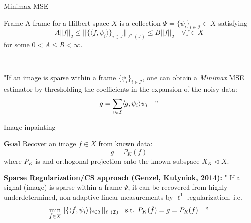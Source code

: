 \begin{frame}{Minimax MSE}

\begin{block}{Frame}
A frame for a Hilbert space $X$ is a collection $\Psi=\{\psi_i\}_{i\in\mathcal{I}}\subset X$ satisfying
$$
A ||f||_2\leq ||\{\langle f,\psi_i\rangle\}_{i\in\mathcal{I}}||_{\ell^2(\mathcal{I})}\leq B||f||_2  \quad \forall f\in X
$$
for some $0<A\leq B<\infty$.
\end{block}

\
\pause

\begin{theorem}[Labate et al., 2012]
"If an image is sparse within a frame $\{\psi_i\}_{i\in \mathcal{I}}$, one can obtain a \textit{Minimax} MSE estimator by thresholding the coefficients in the expansion of the noisy data:
$$
g = \sum_{i\in\mathcal{I}}\langle g,\psi_i\rangle\psi_i \quad "
$$
\end{theorem}
\end{frame}

\begin{frame}{Image inpainting}

\begin{block}{\textbf{Goal}}
 Recover an image $f\in X$ from known data:
$$
g = P_K(f)
$$
where $P_K$ is and orthogonal projection onto the known subspace $X_K\triangleleft X$.
\end{block}

\pause
\bigskip

\begin{block}{\textbf{Sparse Regularization/CS approach (Genzel, Kutyniok, 2014):}}
 " If a signal (image) is sparse within a frame $\Psi$, it can be recovered from highly underdetermined, non-adaptive linear measurements by $\ell^1$-regularization, i.e.
$$
\min_{\tilde{f}\in X}||\{\langle\tilde{f},\psi_i\rangle\}_{i\in\mathcal{I}}||_{\ell^1(\mathcal{I})} \quad \text{s.t. }P_K(\tilde{f})=g=P_K(f) \quad "
$$

\end{block}

\end{frame}

